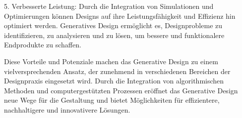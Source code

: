 5. Verbesserte Leistung: Durch die Integration von Simulationen und Optimierungen können Designs auf ihre Leistungsfähigkeit und Effizienz hin optimiert werden. Generatives Design ermöglicht es, Designprobleme zu identifizieren, zu analysieren und zu lösen, um bessere und funktionalere Endprodukte zu schaffen.

Diese Vorteile und Potenziale machen das Generative Design zu einem vielversprechenden Ansatz, der zunehmend in verschiedenen Bereichen der Designpraxis eingesetzt wird. Durch die Integration von algorithmischen Methoden und computergestützten Prozessen eröffnet das Generative Design neue Wege für die Gestaltung und bietet Möglichkeiten für effizientere, nachhaltigere und innovativere Lösungen.